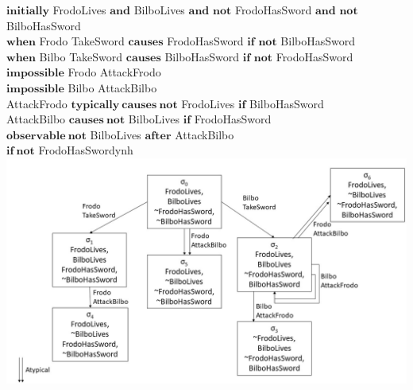 \documentclass[11pt,a4paper]{article}
\begin{document}
    \begin{center}
    $\mathbf{initially}$ FrodoLives $\mathbf{and}$ BilboLives $\mathbf{and}$ $\mathbf{not}$ FrodoHasSword $\mathbf{and}$ $\mathbf{not}$ BilboHasSword\\
    
    $\mathbf{when}$ Frodo TakeSword $\mathbf{causes}$ FrodoHasSword $\mathbf{if}$ $\mathbf{not}$ BilboHasSword\\
    
    $\mathbf{when}$ Bilbo TakeSword $\mathbf{causes}$ BilboHasSword $\mathbf{if}$ $\mathbf{not}$ FrodoHasSword\\
    
    $\mathbf{impossible}$ Frodo AttackFrodo\\
    
    $\mathbf{impossible}$ Bilbo AttackBilbo\\
    
    AttackFrodo $\mathbf{typically} ~ \mathbf{causes~not}$ FrodoLives $\mathbf{if}$ BilboHasSword\\
    
    AttackBilbo $\mathbf{causes~not}$ BilboLives $\mathbf{if}$ FrodoHasSword\\
    
    $\mathbf{observable~not}$ BilboLives $\mathbf{after}$ AttackBilbo\\ $\mathbf{if~not}$ FrodoHasSwordynh
    \includegraphics[width=\textwidth]{resources/graf.jpg} 
    \end{center}
 

\newpage
\end{document}
